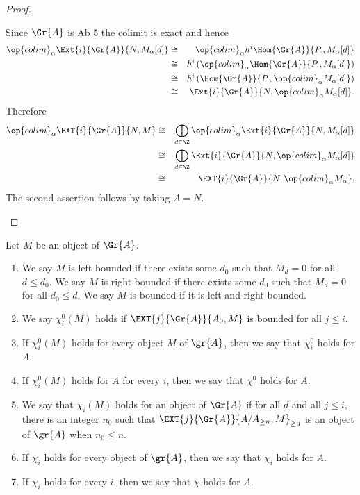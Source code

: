 \begin{prop}
\begin{proof}
\begin{enumerate}
      Since $\Gr{A}$ is Ab 5 the colimit is exact and hence
      \begin{eqnarray*}
        \op{colim}_\alpha \Ext{i}{\Gr{A}}{N, M_\alpha[d]}
        &\cong& \op{colim}_\alpha h^i\Hom{\Gr{A}}{P_\cdot, M_\alpha[d]}\\
        &\cong& h^i\left(\op{colim}_\alpha \Hom{\Gr{A}}{P_\cdot, M_\alpha[d]} \right)\\
        &\cong& h^i\left(\Hom{\Gr{A}}{P_\cdot, \op{colim}_\alpha M_\alpha[d]}\right)\\
        &\cong& \Ext{i}{\Gr{A}}{N, \op{colim}_\alpha M_\alpha[d]}.
      \end{eqnarray*}
      Therefore 
      \begin{eqnarray*}
        \op{colim}_\alpha \EXT{i}{\Gr{A}}{N,M} 
        &\cong& \bigoplus_{d \in \Z}\op{colim}_\alpha \Ext{i}{\Gr{A}}{N, M_\alpha[d]}\\
        &\cong& \bigoplus_{d \in \Z}\Ext{i}{\Gr{A}}{N, \op{colim}_\alpha M_\alpha[d]}\\
        &\cong& \EXT{i}{\Gr{A}}{N, \op{colim}_\alpha M_\alpha}.
      \end{eqnarray*}
      The second assertion follows by taking $A = N$.
    \end{enumerate}
  \end{proof}

  \begin{defn}
    Let $M$ be an object of $\Gr{A}$.
    \begin{enumerate}
    \item
      We say $M$ is left bounded if there exists some $d_0$ such that $M_d = 0$ for all $d \leq d_0$.
      We say $M$ is right bounded if there exists some $d_0$ such that $M_d = 0$ for all $d_0 \leq d$.
      We say $M$ is bounded if it is left and right bounded.
    \item
      We say $\chi_i^0(M)$ holds if $\EXT{j}{\Gr{A}}{A_0, M}$ is bounded for all $j \leq i$.
    \item
      If $\chi^0_i(M)$ holds for every object $M$ of $\gr{A}$, then we say that $\chi^0_i$ holds for $A$.
    \item
      If $\chi^0_i(M)$ holds for $A$ for every $i$, then we say that $\chi^0$ holds for $A$.
    \item
      We say that $\chi_i(M)$ holds for an object of $\Gr{A}$ if for all $d$ and all $j \leq i$, there is an integer $n_0$ such that $\EXT{j}{\Gr{A}}{A/A_{\geq n}, M}_{\geq d}$ is an object of $\gr{A}$ when $n_0 \leq n$.
    \item
      If $\chi_i$ holds for every object of $\gr{A}$, then we say that $\chi_i$ holds for $A$.
    \item
      If $\chi_i$ holds for every $i$, then we say that $\chi$ holds for $A$.
    \end{enumerate}
  \end{defn}


\end{prop}
